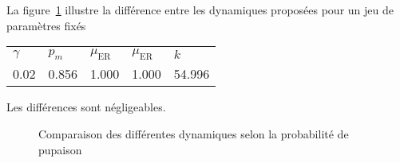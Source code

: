 \documentclass[a4paper, 11pt]{article}
\begin{document}
La figure~\ref{fig:dyn} illustre la différence entre les dynamiques proposées pour un jeu de paramètres fixés
\begin{center}
\begin{tabular}{lllll}
$\gamma$ & $p_m$ & $\mu_{\text{ER}}$ & $\mu_{\text{ER}}$ & $k$\\
0.02 & 0.856 & 1.000 & 1.000 & 54.996
\end{tabular}
\end{center}
Les différences sont négligeables.
\begin{figure}[ht]
\centering
{}
 \caption{Comparaison des différentes dynamiques selon la probabilité de pupaison}
 \label{fig:dyn}
\end{figure}


\clearpage



 
\end{document}
